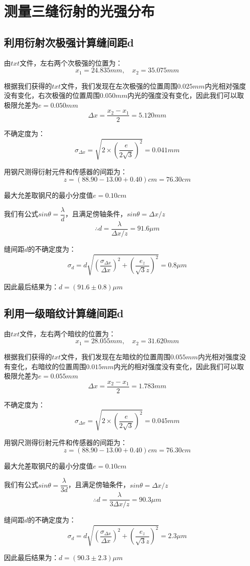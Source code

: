 \documentclass[a4 paper,12pt]{article}
\begin{document}
\section{测量三缝衍射的光强分布}
\subsection{利用衍射次极强计算缝间距d}
由$txt$文件，左右两个次极强的位置为：
$$x_{1}=24.835mm,\quad x_{2}=35.075mm$$
\par 根据我们获得的$txt$文件，我们发现在左次极强的位置周围$0.025mm$内光相对强度没有变化，右次极强的位置周围$0.050mm$内光的强度没有变化，因此我们可以取极限允差为$e=0.050mm$
$$\Delta x=\dfrac{x_{2}-x_{1}}{2}=5.120mm$$
\par 不确定度为：
$$\sigma_{\Delta x}=\sqrt{2\times (\dfrac{e}{2\sqrt{3}})^{2}}=0.041mm$$
\par 用钢尺测得衍射元件和传感器的间距为：
$$z=(88.90-13.00+0.40)cm=76.30cm$$
\par 最大允差取钢尺的最小分度值$e=0.10cm$
\par 我们有公式$sin\theta=\dfrac{\lambda}{d}$，且满足傍轴条件，$sin\theta=\Delta x/z$
$$\therefore d=\dfrac{\lambda}{\Delta x/z}=91.6\mu m$$
\par 缝间距$d$的不确定度为：
$$\sigma_{d}=d\sqrt{(\dfrac{\sigma_{\Delta x}}{\Delta x})^{2}+(\dfrac{e_{z}}{\sqrt{3}z})^{2}}=0.8\mu m$$
\par 因此最后结果为：$d=(91.6\pm 0.8)\mu m$
\subsection{利用一级暗纹计算缝间距d}
由$txt$文件，左右两个暗纹的位置为：
$$x_{1}=28.055mm,\quad x_{2}=31.620mm$$
\par 根据我们获得的$txt$文件，我们发现在左暗纹的位置周围$0.055mm$内光相对强度没有变化，右暗纹的位置周围$0.015mm$内光的相对强度没有变化，因此我们可以取极限允差为$e=0.055mm$
$$\Delta x=\dfrac{x_{2}-x_{1}}{2}=1.783mm$$
\par 不确定度为：
$$\sigma_{\Delta x}=\sqrt{2\times (\dfrac{e}{2\sqrt{3}})^{2}}=0.045mm$$
\par 用钢尺测得衍射元件和传感器的间距为：
$$z=(88.90-13.00+0.40)cm=76.30cm$$
\par 最大允差取钢尺的最小分度值$e=0.10cm$
\par 我们有公式$sin\theta=\dfrac{\lambda}{3d}$，且满足傍轴条件，$sin\theta=\Delta x/z$
$$\therefore d=\dfrac{\lambda}{3\Delta x/z}=90.3\mu m$$
\par 缝间距$d$的不确定度为：
$$\sigma_{d}=d\sqrt{(\dfrac{\sigma_{\Delta x}}{\Delta x})^{2}+(\dfrac{e_{z}}{\sqrt{3}z})^{2}}=2.3\mu m$$
\par 因此最后结果为：$d=(90.3\pm 2.3)\mu m$
\end{document}
